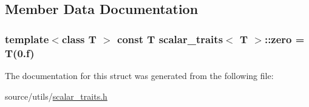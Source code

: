 \subsection{Member Data Documentation}
\hypertarget{structscalar__traits_adea749d014f496ea41335662efeec53f}{
\subsubsection[{zero}]{\setlength{\rightskip}{0pt plus 5cm}template$<$class T $>$ const T {\bf scalar\-\_\-traits}$<$ T $>$\-::zero = T(0.f)\hspace{0.3cm}{\ttfamily [static]}}}\label{structscalar__traits_adea749d014f496ea41335662efeec53f}


The documentation for this struct was generated from the following file\-:\begin{DoxyCompactItemize}
\item 
source/utils/\hyperlink{scalar__traits_8h}{scalar\-\_\-traits.\-h}\end{DoxyCompactItemize}
